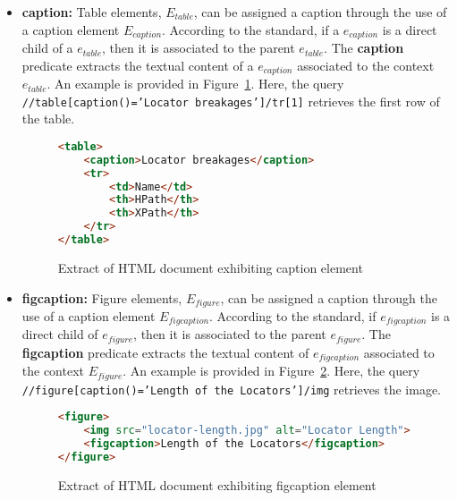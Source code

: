 \begin{itemize}
    \item \textbf{caption:} Table elements, $E_{table}$, can be assigned a caption through the use of a caption element $E_{caption}$. According to the standard, if a $e_{caption}$ is a direct child of a $e_{table}$, then it is associated to the parent $e_{table}$. The \textbf{caption} predicate extracts the textual content of a $e_{caption}$ associated to the context $e_{table}$. An example is provided in Figure~\ref{fig:html-document-caption}. Here, the query \texttt{//table[caption()='Locator breakages']/tr[1]} retrieves the first row of the table. 

\begin{figure}[h!]
\centering
\caption{Extract of HTML document exhibiting caption element}
\label{fig:html-document-caption}
\begin{minipage}{0.8\linewidth}
\begin{lstlisting}[language=HTML]
<table>
    <caption>Locator breakages</caption>
    <tr>
        <td>Name</td>
        <th>HPath</th>
        <th>XPath</th>
    </tr>
</table>
\end{lstlisting}
\end{minipage}
\end{figure}

    \item \textbf{figcaption:} Figure elements, $E_{figure}$, can be assigned a caption through the use of a caption element $E_{figcaption}$. According to the standard, if $e_{figcaption}$ is a direct child of $e_{figure}$, then it is associated to the parent $e_{figure}$. The \textbf{figcaption} predicate extracts the textual content of $e_{figcaption}$ associated to the context $E_{figure}$. An example is provided in Figure~\ref{fig:html-document-figcaption}. Here, the query \texttt{//figure[caption()='Length of the Locators']/img} retrieves the image. 
    
\begin{figure}[h!]
\centering
\caption{Extract of HTML document exhibiting figcaption element}
\label{fig:html-document-figcaption}
\begin{minipage}{0.8\linewidth}
\begin{lstlisting}[language=HTML]
<figure>
    <img src="locator-length.jpg" alt="Locator Length">
    <figcaption>Length of the Locators</figcaption>
</figure>
\end{lstlisting}
\end{minipage}
\end{figure}
    
\end{itemize}

